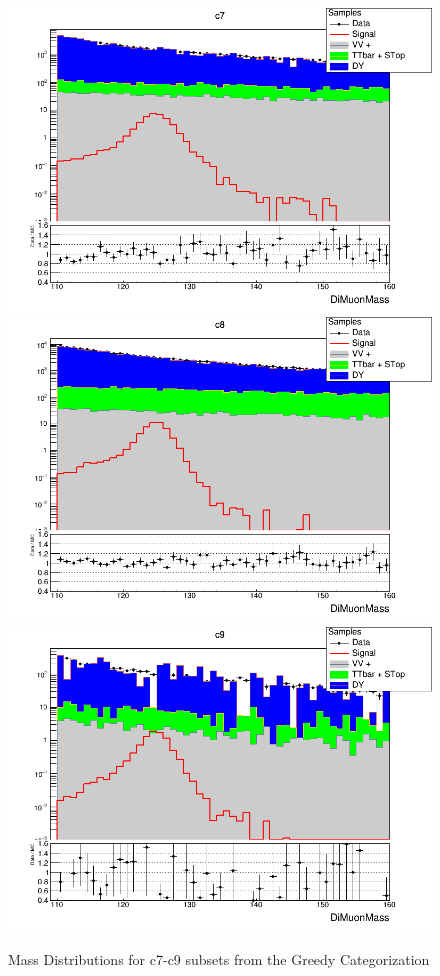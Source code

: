 \begin{figure}[H]
  \centering
  \includegraphics[width=0.65\linewidth]{figures/ch_higgs/distributions/bdt_uf/distribution__c7__DiMuonMass__logY.png}\\
  \includegraphics[width=0.65\linewidth]{figures/ch_higgs/distributions/bdt_uf/distribution__c8__DiMuonMass__logY.png}\\
  \includegraphics[width=0.65\linewidth]{figures/ch_higgs/distributions/bdt_uf/distribution__c9__DiMuonMass__logY.png}
  \caption{Mass Distributions for c7-c9 subsets from the Greedy Categorization}
  \label{fig:higgs_categorization_greedyc7c9}
\end{figure}

